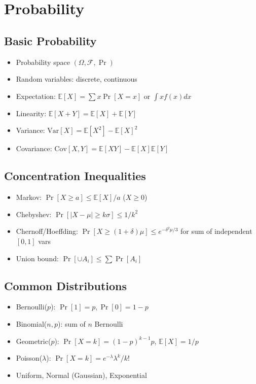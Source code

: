 \section{Probability}

\subsection{Basic Probability}
\begin{itemize}
\item Probability space $(\Omega, \mathcal{F}, \Pr)$
\item Random variables: discrete, continuous
\item Expectation: $\mathbb{E}[X] = \sum x \Pr[X=x]$ or $\int x f(x) dx$
\item Linearity: $\mathbb{E}[X+Y] = \mathbb{E}[X] + \mathbb{E}[Y]$
\item Variance: $\mathrm{Var}[X] = \mathbb{E}[X^2] - \mathbb{E}[X]^2$
\item Covariance: $\mathrm{Cov}[X,Y] = \mathbb{E}[XY] - \mathbb{E}[X]\mathbb{E}[Y]$
\end{itemize}

\subsection{Concentration Inequalities}
\begin{itemize}
\item Markov: $\Pr[X \ge a] \le \mathbb{E}[X]/a$ ($X \ge 0$)
\item Chebyshev: $\Pr[|X-\mu| \ge k\sigma] \le 1/k^2$
\item Chernoff/Hoeffding: $\Pr[X \ge (1+\delta)\mu] \le e^{-\delta^2\mu/3}$ for sum of independent $[0,1]$ vars
\item Union bound: $\Pr[\cup A_i] \le \sum \Pr[A_i]$
\end{itemize}

\subsection{Common Distributions}
\begin{itemize}
\item Bernoulli($p$): $\Pr[1]=p, \Pr[0]=1-p$
\item Binomial($n,p$): sum of $n$ Bernoulli
\item Geometric($p$): $\Pr[X=k] = (1-p)^{k-1}p$, $\mathbb{E}[X]=1/p$
\item Poisson($\lambda$): $\Pr[X=k] = e^{-\lambda}\lambda^k/k!$
\item Uniform, Normal (Gaussian), Exponential
\end{itemize}

